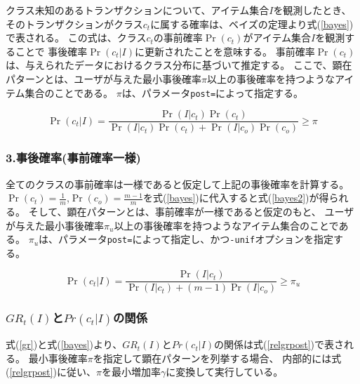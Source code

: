 \documentclass[a4paper]{jarticle}
\begin{document}

クラス未知のあるトランザクションについて、アイテム集合$I$を観測したとき、
そのトランザクションがクラス$c_t$に属する確率は、ベイズの定理より式(\ref{bayes})で表される。
この式は、クラス$c_t$の事前確率$\Pr(c_t)$がアイテム集合$I$を観測することで
事後確率$\Pr(c_t|I)$に更新されたことを意味する。
事前確率$\Pr(c_t)$は、与えられたデータにおけるクラス分布に基づいて推定する。
ここで、顕在パターンとは、ユーザが与えた最小事後確率$\pi$以上の事後確率を持つようなアイテム集合のことである。
$\pi$は、パラメータ\verb|post=|によって指定する。

\begin{equation}
\Pr(c_t|I)=\frac{\Pr(I|c_t)\Pr(c_t)}{\Pr(I|c_t)\Pr(c_t)+\Pr(I|c_o)\Pr(c_o)} \ge \pi \label{bayes}
\end{equation}

\subsubsection*{3.事後確率(事前確率一様)}
全てのクラスの事前確率は一様であると仮定して上記の事後確率を計算する。
$\Pr(c_t)=\frac{1}{m}$,$\Pr(c_o)=\frac{m-1}{m}$を式(\ref{bayes})に代入すると式(\ref{bayes2})が得られる。
そして、顕在パターンとは、事前確率が一様であると仮定のもと、
ユーザが与えた最小事後確率$\pi_u$以上の事後確率を持つようなアイテム集合のことである。
$\pi_u$は、パラメータ\verb|post=|によって指定し、かつ\verb|-unif|オプションを指定する。

\begin{equation}
\Pr(c_t|I)=\frac{\Pr(I|c_t)}{\Pr(I|c_t)+(m-1)\Pr(I|c_o)} \ge \pi_{u} \label{bayes2}
\end{equation}

\subsubsection*{$GR_t(I)$と$Pr(c_t|I)$の関係}
式(\ref{gr})と式(\ref{bayes})より、$GR_t(I)$と$Pr(c_t|I)$の関係は式(\ref{relgrpost})で表される。
最小事後確率$\pi$を指定して顕在パターンを列挙する場合、
内部的には式(\ref{relgrpost})に従い、$\pi$を最小増加率$\gamma$に変換して実行している。
\end{document}
